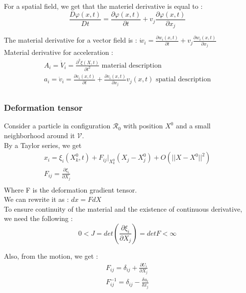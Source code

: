 \documentclass[../main.tex]{subfiles}
\begin{document}
For a spatial field, we get that the materiel derivative is equal to : \begin{equation}
    \frac{D\varphi(x,t)}{D t} = \frac{\partial \varphi(x,t)}{\partial t} + v_j \frac{\partial \varphi(x,t)}{\partial x_j}
\end{equation}

The material derivative for a vector field is : $\dot{w}_i = \frac{\partial w_i(x,t)}{\partial t} + v_j \frac{\partial w_i(x,t)}{\partial x_j}$\\

Material derivative for acceleration :
\begin{equation}
\begin{gathered}
    A_i = \dot{V}_i = \frac{\partial^2 \xi(X,t)}{\partial t^2} \text{ material description}\\
    a_i = \dot{v}_i = \frac{\partial v_i(x,t)}{\partial t} + \frac{\partial v_i(x,t)}{\partial x_j}v_j(x,t) \text{ spatial description}\\
\end{gathered}
\end{equation}


\subsubsection{Deformation tensor}
Consider a particle in configuration $\mathcal{R}_0$ with position $X^0$ and a small neighborhood around it $\mathcal{V}$.\\
By a Taylor series, we get \begin{equation} \begin{gathered}
    x_i = \xi_i(X_k^0, t) + F_{ij}\lvert_{X_k^0} (X_j-X_j^0) + O(\lvert \lvert X-X^0\rvert \rvert^2)\\
    F_{ij} = \frac{\partial \xi_i}{\partial X_j}\\
\end{gathered}
\end{equation}
Where F is the deformation gradient tensor.\\


We can rewrite it as : $dx = FdX$\\
To ensure continuity of the material and the existence of continuous derivative, we need the following : \begin{equation}
    0 < J = det(\frac{\partial \xi_i}{\partial X_j}) = det F < \infty
\end{equation}

Also, from the motion, we get : \begin{equation}
    \begin{gathered}
        F_{ij} = \delta_{ij} + \frac{\partial U_i}{\partial X_j}\\
        F_{ij}^{-1} = \delta_{ij} - \frac{\delta u_i}{\delta x_j}\\
    \end{gathered}
\end{equation}
\end{document}
